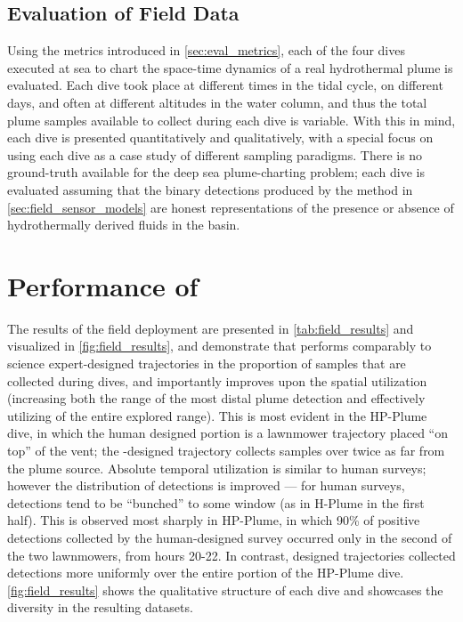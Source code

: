 \subsection{Evaluation of Field Data}
\label{sec:field_eval_metrics}
Using the metrics introduced in \cref{sec:eval_metrics}, each of the four dives executed at sea to chart the space-time dynamics of a real hydrothermal plume is evaluated. Each dive took place at different times in the tidal cycle, on different days, and often at different altitudes in the water column, and thus the total plume samples available to collect during each dive is variable. With this in mind, each dive is presented quantitatively and qualitatively, with a special focus on using each dive as a case study of different sampling paradigms. There is no ground-truth available for the deep sea plume-charting problem; each \Sentry dive is evaluated assuming that the binary detections produced by the method in \cref{sec:field_sensor_models} are honest representations of the presence or absence of hydrothermally derived fluids in the basin. 

\section{Performance of \PHORTEX}
\label{sec:phortex_performance}
The results of the field deployment are presented in \cref{tab:field_results} and visualized in \cref{fig:field_results}, and demonstrate that \PHORTEX performs comparably to science expert-designed trajectories in the proportion of samples that are collected during dives, and importantly improves upon the spatial utilization (increasing both the range of the most distal plume detection and effectively utilizing of the entire explored range). This is most evident in the HP-Plume dive, in which the human designed portion is a lawnmower trajectory placed ``on top'' of the vent; the \PHORTEX-designed trajectory collects samples over twice as far from the plume source. Absolute temporal utilization is similar to human surveys; however the distribution of detections is improved --- for human surveys, detections tend to be ``bunched'' to some window (as in H-Plume in the first half). This is observed most sharply in HP-Plume, in which 90\% of positive detections collected by the human-designed survey occurred only in the second of the two lawnmowers, from hours 20-22. In contrast, \PHORTEX designed trajectories collected detections more uniformly over the entire \PHORTEX portion of the HP-Plume dive. \cref{fig:field_results} shows the qualitative structure of each dive and showcases the diversity in the resulting datasets.

